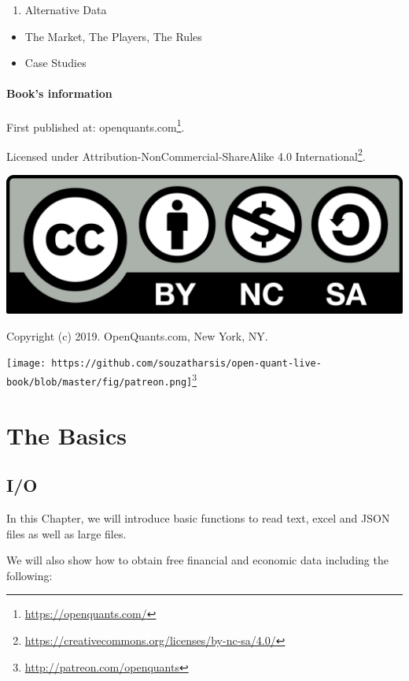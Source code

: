 \documentclass[]{book}
\DeclareRobustCommand{\href}[2]{#2\footnote{\url{#1}}}
\providecommand{\tightlist}{%
  \setlength{\itemsep}{0pt}\setlength{\parskip}{0pt}}
\theoremstyle{definition}
\theoremstyle{definition}
\theoremstyle{definition}
\theoremstyle{remark}
\let\BeginKnitrBlock\begin \let\EndKnitrBlock\end
\begin{document}
\begin{enumerate}
\def\labelenumi{\arabic{enumi}.}
\setcounter{enumi}{5}
\tightlist
\item
  Alternative Data
\end{enumerate}

\begin{itemize}
\tightlist
\item
  The Market, The Players, The Rules
\item
  Case Studies
\end{itemize}

\subsection*{Book's information}\label{books-information}


First published at: \href{https://openquants.com/}{openquants.com}.

Licensed under
\href{https://creativecommons.org/licenses/by-nc-sa/4.0/}{Attribution-NonCommercial-ShareAlike
4.0 International}.

\begin{center}\includegraphics[width=0.15\linewidth]{fig/by-nc-sa} \end{center}

\BeginKnitrBlock{flushright}
Copyright (c) 2019. OpenQuants.com, New York, NY.
\EndKnitrBlock{flushright} \BeginKnitrBlock{flushright}

\href{http://patreon.com/openquants}{\texttt{[image: https://github.com/souzatharsis/open-quant-live-book/blob/master/fig/patreon.png]}}
\EndKnitrBlock{flushright}

\part{The Basics}\label{part-the-basics}

\chapter{I/O}\label{io}

In this Chapter, we will introduce basic functions to read text, excel
and JSON files as well as large files.

We will also show how to obtain free financial and economic data
including the following:
\end{document}
